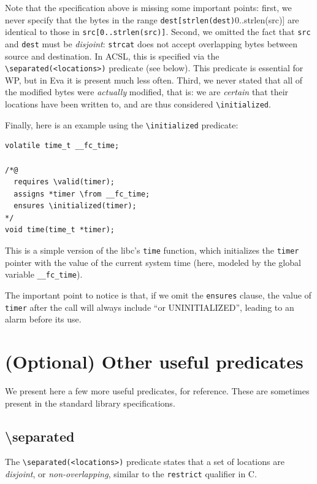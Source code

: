 \documentclass[web]{frama-c-book}
\newcommand{\Eva}{\textsf{Eva}}
\begin{document}
Note that the specification above is missing some important points: first, we
never specify that the bytes in the range
\verb+dest[strlen(dest)+0..strlen(src)] are identical to those in
  \verb+src[0..strlen(src)]+. Second, we omitted the fact that \texttt{src}
  and \texttt{dest} must be {\em disjoint}: \texttt{strcat} does not accept
  overlapping bytes between source and destination. In ACSL, this is specified
  via the \verb+\separated(<locations>)+ predicate (see below). This predicate is essential
  for WP, but in \Eva{} it is present much less often.
  Third, we never stated that all of the modified bytes were {\em actually}
  modified, that is: we are {\em certain} that their locations have been
  written to, and are thus considered \verb+\initialized+.

Finally, here is an example using the \verb+\initialized+ predicate:

\begin{lstlisting}
volatile time_t __fc_time;

/*@
  requires \valid(timer);
  assigns *timer \from __fc_time;
  ensures \initialized(timer);
*/
void time(time_t *timer);
\end{lstlisting}

This is a simple version of the libc's \texttt{time} function, which
initializes the \texttt{timer} pointer with the value of the current system
time (here, modeled by the global variable \verb+__fc_time+).

The important point to notice is that, if we omit the \texttt{ensures} clause,
the value of \texttt{timer} after the call will always include
``or UNINITIALIZED'', leading to an alarm before its use.

\section{(Optional) Other useful predicates}

We present here a few more useful predicates, for reference. These are
sometimes present in the \FramaC standard library specifications.

\subsection*{\textbackslash{}separated}

The \verb+\separated(<locations>)+ predicate states that a set of locations
are {\em disjoint}, or {\em non-overlapping}, similar to the \texttt{restrict}
qualifier in C.
\end{document}
